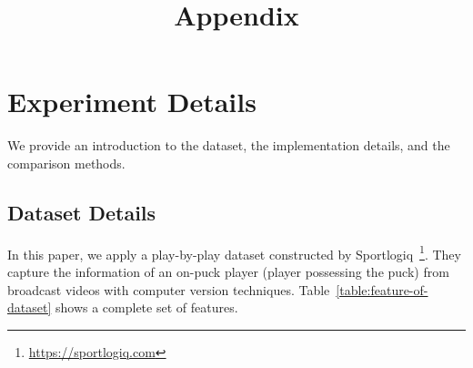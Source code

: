 \documentclass{article}
\title{Appendix}
\begin{document}
\maketitle
\appendix
\section{Experiment Details}
We provide an introduction to the dataset, the implementation details, and the comparison methods.
\subsection{Dataset Details}
In this paper, we apply a play-by-play dataset constructed by Sportlogiq~\footnote{\url{https://sportlogiq.com}}. They capture the information of an on-puck player (player possessing the puck) from broadcast videos with computer version techniques. Table~\ref{table:feature-of-dataset} shows a complete set of features.
\end{document}
